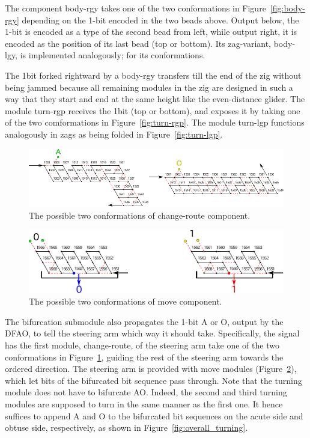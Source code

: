 \documentclass{article}
\theoremstyle{remark}
\begin{document}
The component body-rgy takes one of the two conformations in Figure~\ref{fig:body-rgy} depending on the 1-bit encoded in the two beads above.
Output below, the 1-bit is encoded as a type of the second bead from left, while output right, it is encoded as the position of its last bead (top or bottom).
Its zag-variant, body-lgy, is implemented analogously; for its conformations.

The 1bit forked rightward by a body-rgy transfers till the end of the zig without being jammed because all remaining modules in the zig are designed in such a way that they start and end at the same height like the even-distance glider.
The module turn-rgp receives the 1bit (top or bottom), and exposes it by taking one of the two comformations in Figure~\ref{fig:turn-rgp}.
The module turn-lgp functions analogously in zags as being folded in Figure~\ref{fig:turn-lgp}.

\begin{figure}[h]
\centering
\includegraphics[width=\linewidth]{change_route.pdf}
\caption{The possible two conformations of change-route component.}
\label{fig:change_route}
\end{figure}

\begin{figure}[h]
\centering
\includegraphics[width=\linewidth]{move.pdf}
\caption{The possible two conformations of move component.}
\label{fig:move}
\end{figure}

The bifurcation submodule also propagates the 1-bit A or O, output by the DFAO, to tell the steering arm which way it should take.
Specifically, the signal has the first module, change-route, of the steering arm take one of the two conformations in Figure~\ref{fig:change_route}, guiding the rest of the steering arm towards the ordered direction.
The steering arm is provided with move modules (Figure~\ref{fig:move}), which let bits of the bifurcated bit sequence pass through.  
Note that the turning module does not have to bifurcate AO.
Indeed, the second and third turning modules are supposed to turn in the same manner as the first one.
It hence suffices to append A and O to the bifurcated bit sequences on the acute side and obtuse side, respectively, as shown in Figure~\ref{fig:overall_turning}.
\end{document}
